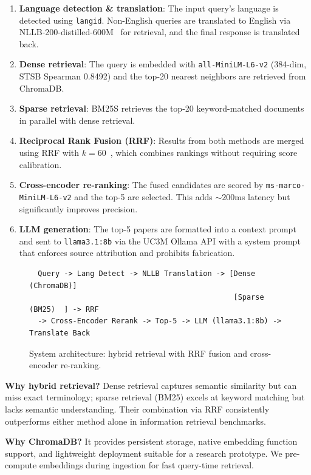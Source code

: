 \documentclass[11pt,a4paper]{article}
\begin{document}
\begin{enumerate}
  \item \textbf{Language detection \& translation}: The input query's language is detected using \texttt{langid}. Non-English queries are translated to English via NLLB-200-distilled-600M~\cite{nllb} for retrieval, and the final response is translated back.
  \item \textbf{Dense retrieval}: The query is embedded with \texttt{all-MiniLM-L6-v2} (384-dim, STSB Spearman 0.8492) and the top-20 nearest neighbors are retrieved from ChromaDB.
  \item \textbf{Sparse retrieval}: BM25S retrieves the top-20 keyword-matched documents in parallel with dense retrieval.
  \item \textbf{Reciprocal Rank Fusion (RRF)}: Results from both methods are merged using RRF with $k{=}60$~\cite{cormack2009}, which combines rankings without requiring score calibration.
  \item \textbf{Cross-encoder re-ranking}: The fused candidates are scored by \texttt{ms-marco-MiniLM-L6-v2} and the top-5 are selected. This adds ${\sim}200$ms latency but significantly improves precision.
  \item \textbf{LLM generation}: The top-5 papers are formatted into a context prompt and sent to \texttt{llama3.1:8b} via the UC3M Ollama API with a system prompt that enforces source attribution and prohibits fabrication.
\end{enumerate}

\begin{figure}[h]
\centering
\small
\begin{verbatim}
  Query -> Lang Detect -> NLLB Translation -> [Dense (ChromaDB)]
                                               [Sparse (BM25)  ] -> RRF
  -> Cross-Encoder Rerank -> Top-5 -> LLM (llama3.1:8b) -> Translate Back
\end{verbatim}
\vspace{-0.5em}
\caption{System architecture: hybrid retrieval with RRF fusion and cross-encoder re-ranking.}
\label{fig:arch}
\end{figure}

\textbf{Why hybrid retrieval?} Dense retrieval captures semantic similarity but can miss exact terminology; sparse retrieval (BM25) excels at keyword matching but lacks semantic understanding. Their combination via RRF consistently outperforms either method alone in information retrieval benchmarks.

\textbf{Why ChromaDB?} It provides persistent storage, native embedding function support, and lightweight deployment suitable for a research prototype. We pre-compute embeddings during ingestion for fast query-time retrieval.
\end{document}
